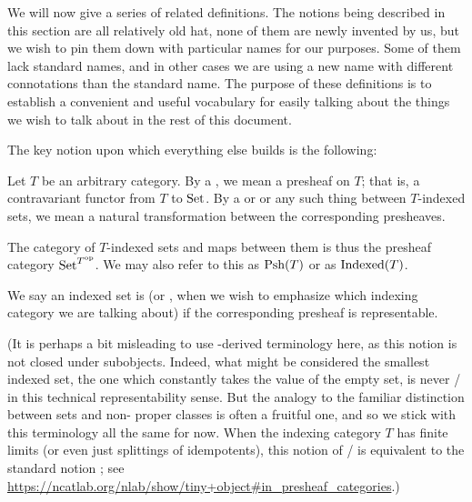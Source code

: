 
We will now give a series of related definitions. The notions being described in this section are all relatively old hat, none of them are newly invented by us, but we wish to pin them down with particular names for our purposes. Some of them lack standard names, and in other cases we are using a new name with different connotations than the standard name. The purpose of these definitions is to establish a convenient and useful vocabulary for easily talking about the things we wish to talk about in the rest of this document.


The key notion upon which everything else builds is the following:

\begin{definition}
Let $T$ be an arbitrary category. By a , we mean a presheaf on $T$; that is, a contravariant functor from $T$ to $\mathrm{Set}$. By a  or  or any such thing between $T$-indexed sets, we mean a natural transformation between the corresponding presheaves.
\end{definition}

\begin{definition}
The category of $T$-indexed sets and maps between them is thus the presheaf category $\mathrm{Set}^{T^{\mathrm{op}}}$. We may also refer to this as $\operatorname{Psh}(T)$ or as $\operatorname{Indexed}(T)$.
\end{definition}

\begin{definition}
We say an indexed set is  (or , when we wish to emphasize which indexing category we are talking about) if the corresponding presheaf is representable. 
\end{definition}

(It is perhaps a bit misleading to use -derived terminology here, as this notion is not closed under subobjects. Indeed, what might be considered the smallest indexed set, the one which constantly takes the value of the empty set, is never \repsmall/ in this technical representability sense. But the analogy to the familiar distinction between  sets and non- proper classes is often a fruitful one, and so we stick with this terminology all the same for now. When the indexing category $T$ has finite limits (or even just splittings of idempotents), this notion of \repsmall/ is equivalent to the standard notion ; see \url{https://ncatlab.org/nlab/show/tiny+object#in_presheaf_categories}.)

